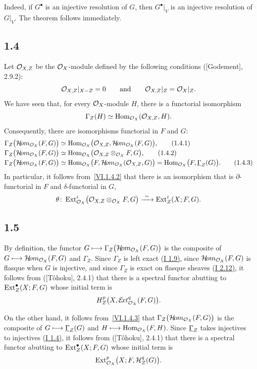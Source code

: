 Indeed, if $G^{\bullet}$ is an injective resolution of $G$, then
$G^{\bullet}|_V$ is an injective resolution of $G|_V$. The theorem follows
immediately.

\subsection*{1.4}
Let $\mathcal O_{X,Z}$ be the $\mathcal O_X$-module defined by the following conditions
\textup{([Godement], 2.9.2)}:
\[
 \mathcal O_{X,Z}|_{X-Z}=0
 \qquad\text{and}\qquad
 \mathcal O_{X,Z}|_Z=\mathcal O_X|_Z.
\]
We have seen that, for every $\mathcal O_X$-module $H$, there is a functorial
isomorphism
\[
 \Gamma_Z(H)\simeq \operatorname{Hom}_{\mathcal O_X}(\mathcal O_{X,Z},H).
\]
Consequently, there are isomorphisms functorial in $F$ and $G$:
\begin{align}
 \Gamma_Z\bigl(\mathcal H\!om_{\mathcal O_X}(F,G)\bigr)
  &\simeq \operatorname{Hom}_{\mathcal O_X}\bigl(\mathcal O_{X,Z},\mathcal H\!om_{\mathcal O_X}(F,G)\bigr),
   \tag{1.4.1}\label{VI.1.4.1}\\[-0.15em]
 \Gamma_Z\bigl(\mathcal H\!om_{\mathcal O_X}(F,G)\bigr)
  &\simeq \operatorname{Hom}_{\mathcal O_X}\bigl(\mathcal O_{X,Z}\otimes_{\mathcal O_X}F,G\bigr),
   \tag{1.4.2}\label{VI.1.4.2}\\[-0.15em]
 \Gamma_Z\bigl(\mathcal H\!om_{\mathcal O_X}(F,G)\bigr)
  &\simeq \operatorname{Hom}_{\mathcal O_X}\bigl(F,\mathcal H\!om_{\mathcal O_X}(\mathcal O_{X,Z},G)\bigr)
   =\operatorname{Hom}_{\mathcal O_X}\bigl(F,\underline{\Gamma}_Z(G)\bigr).
   \tag{1.4.3}\label{VI.1.4.3}
\end{align}
In particular, it follows from~\eqref{VI.1.4.2} that there is an
isomorphism that is $\partial$-functorial in $F$ and $\delta$-functorial in $G$,
\[
 \theta\colon
 \operatorname{Ext}_{\mathcal O_X}^{i}\bigl(\mathcal O_{X,Z}\otimes_{\mathcal O_X}F,G\bigr)
 \xrightarrow{\ \sim\ }
 \operatorname{Ext}_Z^{i}(X;F,G).
\]

\subsection*{1.5}
By definition, the functor
$G\longmapsto\Gamma_Z\bigl(\mathcal H\!om_{\mathcal O_X}(F,G)\bigr)$ is the composite of
$G\longmapsto\mathcal H\!om_{\mathcal O_X}(F,G)$ and $\Gamma_Z$. Since $\Gamma_Z$ is left
exact \textup{(\hyperref[I.1.9]{I 1.9)}}, since $\mathcal H\!om_{\mathcal O_X}(F,G)$ is flasque when $G$ is
injective, and since $\Gamma_Z$ is exact on flasque sheaves \textup{(\hyperref[I.2.12]{I 2.12)}},
it follows from \textup{([T\^ohoku], 2.4.1)} that there is a spectral functor
abutting to $\operatorname{Ext}_Z^{\bullet}(X;F,G)$ whose initial term is
\[
 H_Z^p\bigl(X,\mathcal E\!xt_{\mathcal O_X}^q(F,G)\bigr).
\]

On the other hand, it follows from~\eqref{VI.1.4.3} that
$\Gamma_Z\bigl(\mathcal H\!om_{\mathcal O_X}(F,G)\bigr)$ is the composite of
$G\longmapsto\underline{\Gamma}_Z(G)$ and
$H\longmapsto\operatorname{Hom}_{\mathcal O_X}(F,H)$. Since $\underline{\Gamma}_Z$ takes injectives to
injectives \textup{(\hyperref[I.1.4]{I 1.4)}}, it follows from \textup{([T\^ohoku], 2.4.1)}
that there is a spectral functor abutting to $\operatorname{Ext}_Z^{\bullet}(X;F,G)$ whose
initial term is
\[
 \operatorname{Ext}_{\mathcal O_X}^p\bigl(X;F,\mathcal H_Z^q(G)\bigr).
\]


